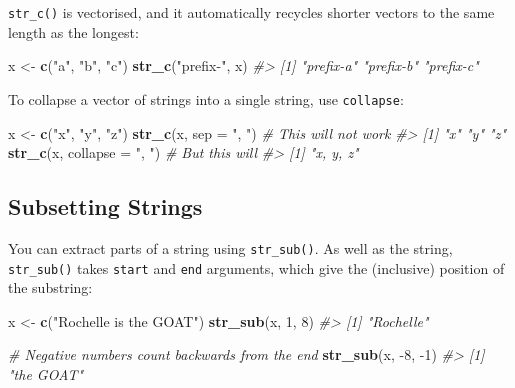 \documentclass[
]{book}
\newenvironment{Shaded}{\begin{snugshade}}{\end{snugshade}}
\newcommand{\CommentTok}[1]{\textcolor[rgb]{0.56,0.35,0.01}{\textit{#1}}}
\newcommand{\DataTypeTok}[1]{\textcolor[rgb]{0.13,0.29,0.53}{#1}}
\newcommand{\DecValTok}[1]{\textcolor[rgb]{0.00,0.00,0.81}{#1}}
\newcommand{\KeywordTok}[1]{\textcolor[rgb]{0.13,0.29,0.53}{\textbf{#1}}}
\newcommand{\NormalTok}[1]{#1}
\newcommand{\StringTok}[1]{\textcolor[rgb]{0.31,0.60,0.02}{#1}}
\begin{document}
\texttt{str\_c()} is vectorised, and it automatically recycles shorter vectors to the same length as the longest:

\begin{Shaded}
\begin{Highlighting}[]
\NormalTok{x <-}\StringTok{ }\KeywordTok{c}\NormalTok{(}\StringTok{"a"}\NormalTok{, }\StringTok{"b"}\NormalTok{, }\StringTok{"c"}\NormalTok{)}
\KeywordTok{str_c}\NormalTok{(}\StringTok{"prefix-"}\NormalTok{, x)}
\CommentTok{#> [1] "prefix-a" "prefix-b" "prefix-c"}
\end{Highlighting}
\end{Shaded}

To collapse a vector of strings into a single string, use \texttt{collapse}:

\begin{Shaded}
\begin{Highlighting}[]
\NormalTok{x <-}\StringTok{ }\KeywordTok{c}\NormalTok{(}\StringTok{"x"}\NormalTok{, }\StringTok{"y"}\NormalTok{, }\StringTok{"z"}\NormalTok{)}
\KeywordTok{str_c}\NormalTok{(x, }\DataTypeTok{sep =} \StringTok{", "}\NormalTok{) }\CommentTok{# This will not work}
\CommentTok{#> [1] "x" "y" "z"}
\KeywordTok{str_c}\NormalTok{(x, }\DataTypeTok{collapse =} \StringTok{", "}\NormalTok{) }\CommentTok{# But this will}
\CommentTok{#> [1] "x, y, z"}
\end{Highlighting}
\end{Shaded}

\hypertarget{subsetting-strings}{%
\subsection{Subsetting Strings}\label{subsetting-strings}}

You can extract parts of a string using \texttt{str\_sub()}. As well as the string, \texttt{str\_sub()} takes \texttt{start} and \texttt{end} arguments, which give the (inclusive) position of the substring:

\begin{Shaded}
\begin{Highlighting}[]
\NormalTok{x <-}\StringTok{ }\KeywordTok{c}\NormalTok{(}\StringTok{"Rochelle is the GOAT"}\NormalTok{)}
\KeywordTok{str_sub}\NormalTok{(x, }\DecValTok{1}\NormalTok{, }\DecValTok{8}\NormalTok{)}
\CommentTok{#> [1] "Rochelle"}

\CommentTok{# Negative numbers count backwards from the end}
\KeywordTok{str_sub}\NormalTok{(x, }\DecValTok{-8}\NormalTok{, }\DecValTok{-1}\NormalTok{)}
\CommentTok{#> [1] "the GOAT"}
\end{Highlighting}
\end{Shaded}
\end{document}

